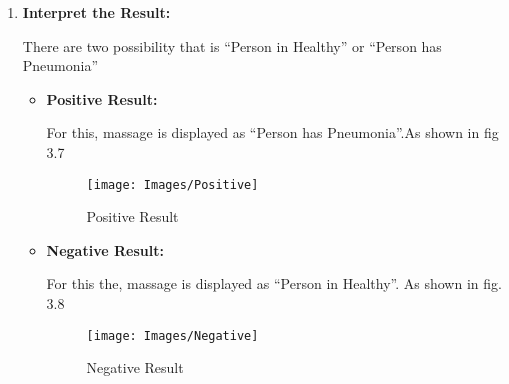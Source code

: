 \begin{enumerate} [label=Step \arabic*:]
	\item \textbf {Interpret the Result:}
	
	There are two possibility that is “Person in Healthy” or “Person has Pneumonia”
	\begin{itemize}
		
	
	\item \textbf {Positive Result:}
	
	 For this, massage is displayed as “Person has Pneumonia”.As shown in fig 3.7
		\begin{figure}[h!]
			\centering
			\texttt{[image: Images/Positive]}
			\caption{Positive Result}
		\end{figure}
	
	
	
	\item \textbf {Negative Result:}
	
	 For this the, massage is displayed as “Person in Healthy”. As shown in fig. 3.8
		\begin{figure}[h!]
			\centering
			\texttt{[image: Images/Negative]}
			\caption{Negative Result}
		\end{figure}
	
\end{itemize}


		
\end{enumerate}



